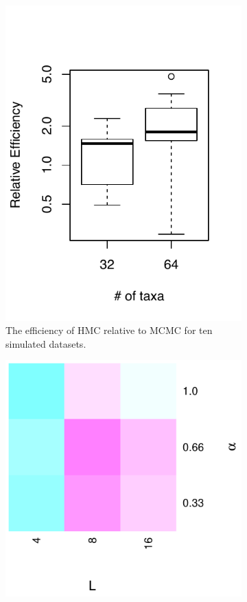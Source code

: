\documentclass{article}
\begin{document}
    \begin{figure}
        \centering
        \begin{subfigure}{0.45\textwidth}
            \centering
            \includegraphics[scale=0.8]{boxplot.pdf}
            \caption{The efficiency of \ac{HMC} relative to \ac{MCMC}
                     for ten simulated datasets.}
        \end{subfigure}
        \begin{subfigure}{0.45\textwidth}
            \centering
            \includegraphics[scale=0.8]{heatmap.pdf}

\end{subfigure}
\end{figure}
\end{document}
